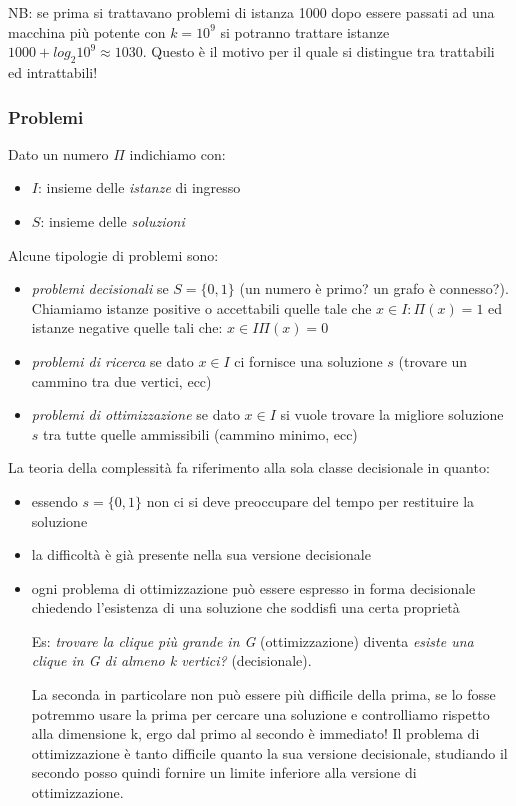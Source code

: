 NB: se prima si trattavano problemi di istanza 1000 dopo essere passati ad una macchina più potente con $k = 10^9$ si potranno trattare istanze $1000 + log_2{10^9} \approx 1030$. Questo è il motivo per il quale si distingue tra trattabili ed intrattabili!

\subsubsection{Problemi}
Dato un numero $\Pi$ indichiamo con:
\begin{itemize}
    \item $I$: insieme delle \emph{istanze} di ingresso
    \item $S$: insieme delle \emph{soluzioni}
\end{itemize}
Alcune tipologie di problemi sono:
\begin{itemize}
    \item \emph{problemi decisionali} se $S = \{0, 1\}$ (un numero è primo? un grafo è connesso?). Chiamiamo istanze positive o accettabili quelle tale che $x \in I : \Pi(x) = 1$ ed istanze negative quelle tali che: $x \in I \Pi(x) = 0$
    \item \emph{problemi di ricerca} se dato $x \in I$ ci fornisce una soluzione $s$ (trovare un cammino tra due vertici, ecc)
    \item \emph{problemi di ottimizzazione} se dato $x \in I$ si vuole trovare la migliore soluzione $s$ tra tutte quelle ammissibili (cammino minimo, ecc)
\end{itemize}
La teoria della complessità fa riferimento alla sola classe decisionale in quanto:
\begin{itemize}
    \item essendo $s = \{0, 1\}$ non ci si deve preoccupare del tempo per restituire la soluzione
    \item la difficoltà è già presente nella sua versione decisionale
    \item ogni problema di ottimizzazione può essere espresso in forma decisionale chiedendo l'esistenza di una soluzione che soddisfi una certa proprietà
    
    Es: \emph{trovare la clique più grande in G} (ottimizzazione) diventa \emph{esiste una clique in G di almeno k vertici?} (decisionale).
    
    La seconda in particolare non può essere più difficile della prima, se lo fosse potremmo usare la prima per cercare una soluzione e controlliamo rispetto alla dimensione k, ergo dal primo al secondo è immediato!
    Il problema di ottimizzazione è tanto difficile quanto la sua versione decisionale, studiando il secondo posso quindi fornire un limite inferiore alla versione di ottimizzazione.
\end{itemize}

